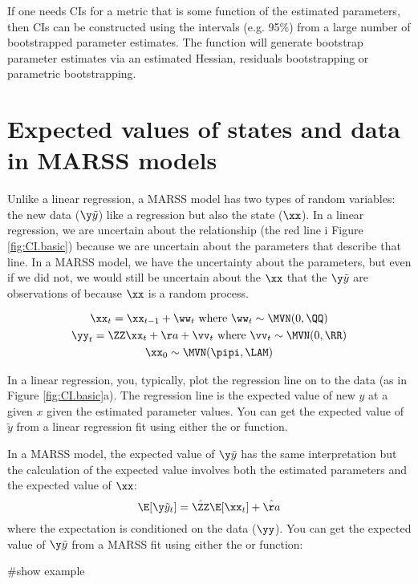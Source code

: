 If one needs CIs for a metric that is some function of the estimated parameters, then CIs can be constructed using the intervals (e.g. 95\%) from a large number of bootstrapped parameter estimates.  The function \verb@MARSSboot@ will generate bootstrap parameter estimates via an estimated Hessian, residuals bootstrapping or parametric bootstrapping.


\section{Expected values of states and data in MARSS models}

Unlike a linear regression, a MARSS model has two types of random variables: the new data ($\y\tilde{y}$) like a regression but also the state ($\xx$).  In a linear regression, we are uncertain about the relationship (the red line i Figure \ref{fig:CI.basic}) because we are uncertain about the parameters that describe that line.  In a MARSS model, we have the uncertainty about the parameters, but even if we did not, we would still be uncertain about the $\xx$ that the $\y\tilde{y}$ are observations of because $\xx$ is a random process.

\begin{equation}
\begin{gathered}
\xx_t = \xx_{t-1}+\ww_t \text{ where } \ww_t \sim \MVN(0,\QQ) \\
\yy_t = \ZZ\xx_t+\aa+\vv_t \text{ where } \vv_t \sim \MVN(0,\RR)  \\
\xx_0 \sim \MVN(\pipi,\LAM) 
\end{gathered}   
\end{equation}

In a linear regression, you, typically, plot the regression line on to the data (as in Figure \ref{fig:CI.basic}a).  The regression line is the expected value of new $y$ at a given $x$ given the estimated parameter values.  You can get the expected value of $\tilde{y}$ from a linear regression fit using either the \verb@fitted@ or \verb@predict@ function.

In a MARSS model, the expected value of $\y\tilde{y}$ has the same interpretation but the calculation of the expected value involves both the estimated parameters and the expected value of $\xx$:
\begin{equation}
\E[\y\tilde{y}_t] = \hat{\ZZ}\E[\xx_t] + \hat{\aa}
\end{equation}
where the expectation is conditioned on the data ($\yy$).  You can get the expected value of $\y\tilde{y}$ from a MARSS fit using either the \verb@fitted@ or \verb@predict@ function:
\begin{Schunk}
\begin{Sinput}
 #show example
\end{Sinput}
\end{Schunk}

